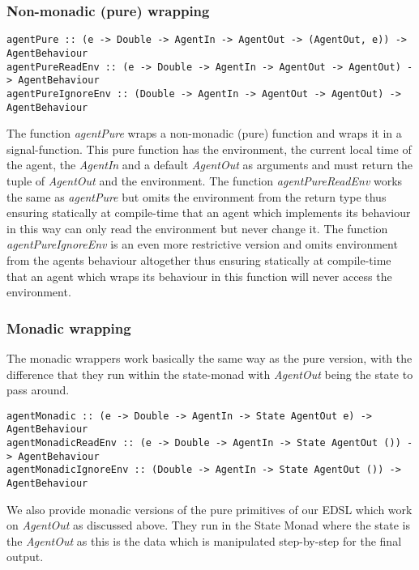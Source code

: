 \subsubsection{Non-monadic (pure) wrapping}

\begin{verbatim}
agentPure :: (e -> Double -> AgentIn -> AgentOut -> (AgentOut, e)) -> AgentBehaviour
agentPureReadEnv :: (e -> Double -> AgentIn -> AgentOut -> AgentOut) -> AgentBehaviour
agentPureIgnoreEnv :: (Double -> AgentIn -> AgentOut -> AgentOut) -> AgentBehaviour
\end{verbatim}

The function \textit{agentPure} wraps a non-monadic (pure) function and wraps it in a signal-function. This pure function has the environment, the current local time of the agent, the \textit{AgentIn} and a default \textit{AgentOut} as arguments and must return the tuple of \textit{AgentOut} and the environment.
The function \textit{agentPureReadEnv} works the same as \textit{agentPure} but omits the environment from the return type thus ensuring statically at compile-time that an agent which implements its behaviour in this way can only read the environment but never change it.
The function \textit{agentPureIgnoreEnv} is an even more restrictive version and omits environment from the agents behaviour altogether thus ensuring statically at compile-time that an agent which wraps its behaviour in this function will never access the environment.

\subsubsection{Monadic wrapping}
The monadic wrappers work basically the same way as the pure version, with the difference that they run within the state-monad with \textit{AgentOut} being the state to pass around.

\begin{verbatim}
agentMonadic :: (e -> Double -> AgentIn -> State AgentOut e) -> AgentBehaviour
agentMonadicReadEnv :: (e -> Double -> AgentIn -> State AgentOut ()) -> AgentBehaviour
agentMonadicIgnoreEnv :: (Double -> AgentIn -> State AgentOut ()) -> AgentBehaviour
\end{verbatim}

We also provide monadic versions of the pure primitives of our EDSL which work on \textit{AgentOut} as discussed above. They run in the State Monad where the state is the \textit{AgentOut} as this is the data which is manipulated step-by-step for the final output. 

